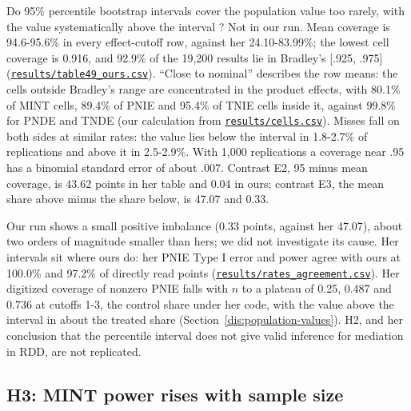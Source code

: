 Do 95\% percentile bootstrap intervals cover the population value too rarely, with the value systematically above the interval \citep[Table 4.9, printed p.~124; Chapter 5, p.~150]{chen2021}? Not in our run. Mean coverage is 94.6-95.6\% in every effect-cutoff row, against her 24.10-83.99\%; the lowest cell coverage is 0.916, and 92.9\% of the 19,200 results lie in Bradley's [.925, .975] (\href{https://github.com/alectionary/vibe-math/blob/master/formalization/chen-rdd-mediation/results/table49_ours.csv}{\nolinkurl{results/table49_ours.csv}}). ``Close to nominal'' describes the row means: the cells outside Bradley's range are concentrated in the product effects, with 80.1\% of MINT cells, 89.4\% of PNIE and 95.4\% of TNIE cells inside it, against 99.8\% for PNDE and TNDE (our calculation from \href{https://github.com/alectionary/vibe-math/blob/master/formalization/chen-rdd-mediation/results/cells.csv}{\nolinkurl{results/cells.csv}}). Misses fall on both sides at similar rates: the value lies below the interval in 1.8-2.7\% of replications and above it in 2.5-2.9\%. With 1,000 replications a coverage near .95 has a binomial standard error of about .007. Contrast E2, 95 minus mean coverage, is 43.62 points in her table and 0.04 in ours; contrast E3, the mean share above minus the share below, is 47.07 and 0.33.

Our run shows a small positive imbalance (0.33 points, against her 47.07), about two orders of magnitude smaller than hers; we did not investigate its cause. Her intervals sit where ours do: her PNIE Type I error and power agree with ours at 100.0\% and 97.2\% of directly read points (\href{https://github.com/alectionary/vibe-math/blob/master/formalization/chen-rdd-mediation/results/rates_agreement.csv}{\nolinkurl{results/rates_agreement.csv}}). Her digitized coverage of nonzero PNIE falls with $n$ to a plateau of 0.25, 0.487 and 0.736 at cutoffs 1-3, the control share under her code, with the value above the interval in about the treated share (Section~\ref{dis:population-values}). H2, and her conclusion that the percentile interval does not give valid inference for mediation in RDD, are not replicated.

\subsection{H3: MINT power rises with sample size}\label{sec:h3}

